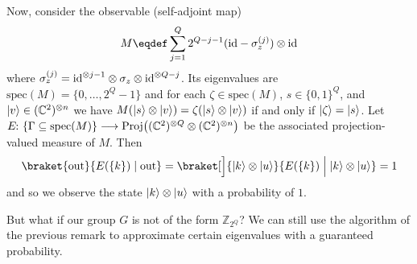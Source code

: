 \documentclass[a4paper, oneside, 12pt]{amsart}
\begin{document}
\begin{remark}
Now, consider the observable (\ie self-adjoint map)
\begin{equation}\label{eq:measuring-the-comp-basis}
  M \eqdef \sum_{j=1}^{Q} 2^{Q-j-1} ( \id - \sigma_z^{(j)}) \otimes \id
\end{equation}
where \(\sigma_z^{(j)}= \mathrm{id}^{\otimes j-1} \otimes \sigma_{z} \otimes \mathrm{id}^{\otimes Q-j} \).
Its eigenvalues are \(\mathrm{spec}(M) =\{0, \dots , 2^{Q}-1\}\) and for each \(\zeta \in \mathrm{spec}(M)\), \(s \in\{0,1\}^{Q}\), and \(\lvert v\rangle \in ( \mathbb{C}^{2})^{\otimes n}\) we have \(M (\lvert s\rangle\otimes \lvert v\rangle )= \zeta (\lvert s\rangle \otimes \lvert v\rangle) \) if and only if \(\lvert\zeta\rangle = \lvert s\rangle\).
Let \(E \from\{ \Gamma \subseteq \mathrm{spec}(M)\} \to \mathrm{Proj}\big((\mathbb{C}^2)^{\otimes Q} \otimes (\mathbb{C}^2)^{\otimes n}\big)\) be the associated projection-valued measure of \(M\).
Then
\begin{equation*}
  \braket{\mathrm{out}}{E(\{k\}) \mid \mathrm{out}}
  = \braket[\Big]{\ket{k} \otimes \ket{u}}{E(\{k\}) \;\Big|\; \ket{k} \otimes \ket{u}}
  = 1
\end{equation*}
and so we observe the state  \(\lvert k\rangle \otimes \lvert u\rangle\) with a probability of \(1\).
\end{remark}

But what if our group \(G\) is not of the form \( \mathbb{Z}_{2^{Q}}\)? We can still use the algorithm of the previous remark to approximate certain eigenvalues with a guaranteed probability.
\end{document}
